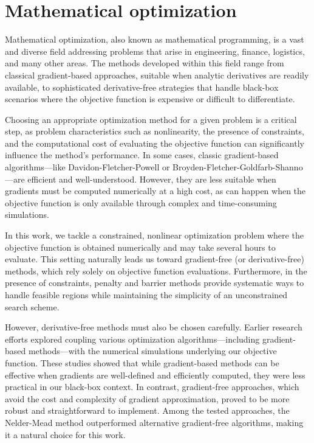 \chapter{Mathematical optimization}\label{optimization}

Mathematical optimization, also known as mathematical programming, is a vast and diverse field addressing problems that arise in engineering, finance, logistics, and many other areas. The methods developed within this field range from classical gradient-based approaches, suitable when analytic derivatives are readily available, to sophisticated derivative-free strategies that handle black-box scenarios where the objective function is expensive or difficult to differentiate.

Choosing an appropriate optimization method for a given problem is a critical step, as problem characteristics such as nonlinearity, the presence of constraints, and the computational cost of evaluating the objective function can significantly influence the method's performance. In some cases, classic gradient-based algorithms—like Davidon-Fletcher-Powell \cite{Fletcher1963} or Broyden-Fletcher-Goldfarb-Shanno \cite{broyden1970}—are efficient and well-understood. However, they are less suitable when gradients must be computed numerically at a high cost, as can happen when the objective function is only available through complex and time-consuming simulations.

In this work, we tackle a constrained, nonlinear optimization problem where the objective function is obtained numerically and may take several hours to evaluate. This setting naturally leads us toward gradient-free (or derivative-free) methods, which rely solely on objective function evaluations. Furthermore, in the presence of constraints, penalty and barrier methods provide systematic ways to handle feasible regions while maintaining the simplicity of an unconstrained search scheme.

However, derivative-free methods must also be chosen carefully. Earlier research efforts \cite{buresBP, buresVU} explored coupling various optimization algorithms—including gradient-based methods—with the numerical simulations underlying our objective function. These studies showed that while gradient-based methods can be effective when gradients are well-defined and efficiently computed, they were less practical in our black-box context. In contrast, gradient-free approaches, which avoid the cost and complexity of gradient approximation, proved to be more robust and straightforward to implement. Among the tested approaches, the Nelder-Mead method outperformed alternative gradient-free algorithms, making it a natural choice for this work.


